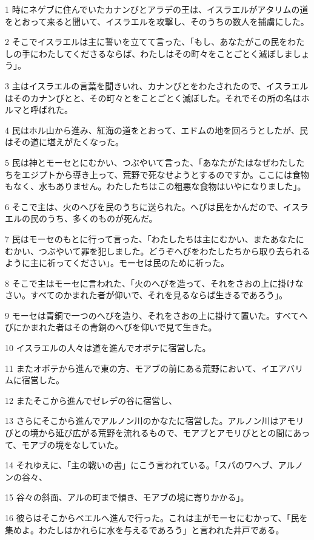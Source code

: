 \par 1 時にネゲブに住んでいたカナンびとアラデの王は、イスラエルがアタリムの道をとおって来ると聞いて、イスラエルを攻撃し、そのうちの数人を捕虜にした。
\par 2 そこでイスラエルは主に誓いを立てて言った、「もし、あなたがこの民をわたしの手にわたしてくださるならば、わたしはその町々をことごとく滅ぼしましょう」。
\par 3 主はイスラエルの言葉を聞きいれ、カナンびとをわたされたので、イスラエルはそのカナンびとと、その町々とをことごとく滅ぼした。それでその所の名はホルマと呼ばれた。
\par 4 民はホル山から進み、紅海の道をとおって、エドムの地を回ろうとしたが、民はその道に堪えがたくなった。
\par 5 民は神とモーセとにむかい、つぶやいて言った、「あなたがたはなぜわたしたちをエジプトから導き上って、荒野で死なせようとするのですか。ここには食物もなく、水もありません。わたしたちはこの粗悪な食物はいやになりました」。
\par 6 そこで主は、火のへびを民のうちに送られた。へびは民をかんだので、イスラエルの民のうち、多くのものが死んだ。
\par 7 民はモーセのもとに行って言った、「わたしたちは主にむかい、またあなたにむかい、つぶやいて罪を犯しました。どうぞへびをわたしたちから取り去られるように主に祈ってください」。モーセは民のために祈った。
\par 8 そこで主はモーセに言われた、「火のへびを造って、それをさおの上に掛けなさい。すべてのかまれた者が仰いで、それを見るならば生きるであろう」。
\par 9 モーセは青銅で一つのへびを造り、それをさおの上に掛けて置いた。すべてへびにかまれた者はその青銅のへびを仰いで見て生きた。
\par 10 イスラエルの人々は道を進んでオボテに宿営した。
\par 11 またオボテから進んで東の方、モアブの前にある荒野において、イエアバリムに宿営した。
\par 12 またそこから進んでゼレデの谷に宿営し、
\par 13 さらにそこから進んでアルノン川のかなたに宿営した。アルノン川はアモリびとの境から延び広がる荒野を流れるもので、モアブとアモリびととの間にあって、モアブの境をなしていた。
\par 14 それゆえに、「主の戦いの書」にこう言われている。「スパのワヘブ、アルノンの谷々、
\par 15 谷々の斜面、アルの町まで傾き、モアブの境に寄りかかる」。
\par 16 彼らはそこからベエルへ進んで行った。これは主がモーセにむかって、「民を集めよ。わたしはかれらに水を与えるであろう」と言われた井戸である。
